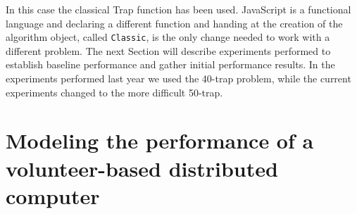\documentclass[letterpaper]{article}
\begin{document}
In this case the classical Trap function \citep{Ackley1987} has been
used. JavaScript is a functional language and declaring a different 
function and handing at the creation of the algorithm object, called
{\tt Classic}, is the only change needed to work with a different
problem. The next Section will describe experiments performed to
establish baseline performance and gather initial performance
results. In the experiments performed last year we used the 40-trap
problem, while the current experiments changed to the more difficult 50-trap.

\section{Modeling the performance of a volunteer-based distributed computer} 
\label{sec:experiments}
\end{document}
